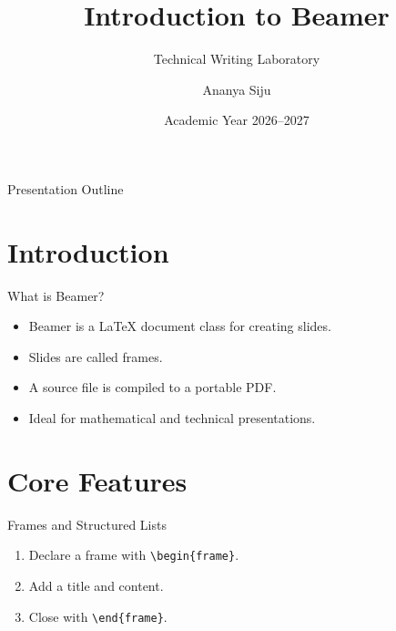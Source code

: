 \documentclass[aspectratio=169,11pt]{beamer}
\title[Beamer Lab]{Introduction to Beamer}
\subtitle{Technical Writing Laboratory}
\author[Ananya Siju]{Ananya Siju}
\institute[MNIT Jaipur]{
Department of Computer Science and Engineering\\
MNIT Jaipur
}
\date[Academic Year 2026--2027]{
Academic Year 2026--2027
}
\begin{document}
\begin{frame}
    \titlepage
\end{frame}

\begin{frame}{Presentation Outline}

    \tableofcontents

\end{frame}

\section{Introduction}

\begin{frame}{What is Beamer?}

    \begin{itemize}
        \item Beamer is a LaTeX document class
              for creating slides.

        \item Slides are called frames.

        \item A source file is compiled
              to a portable PDF.

        \item Ideal for mathematical
              and technical presentations.
    \end{itemize}

\end{frame}

\section{Core Features}

\begin{frame}{Frames and Structured Lists}

    \begin{enumerate}
        \item Declare a frame with
              \texttt{\textbackslash begin\{frame\}}.

        \item Add a title and content.

        \item Close with
              \texttt{\textbackslash end\{frame\}}.
    \end{enumerate}

\end{frame}
\end{document}

